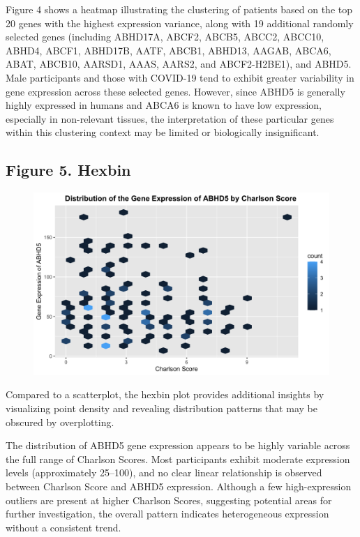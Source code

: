 \documentclass{article}
\begin{document}
Figure 4 shows a heatmap illustrating the clustering of patients based on the top 20 genes with the highest expression variance, along with 19 additional randomly selected genes (including ABHD17A, ABCF2, ABCB5, ABCC2, ABCC10, ABHD4, ABCF1, ABHD17B, AATF, ABCB1, ABHD13, AAGAB, ABCA6, ABAT, ABCB10, AARSD1, AAAS, AARS2, and ABCF2-H2BE1), and ABHD5. Male participants and those with COVID-19 tend to exhibit greater variability in gene expression across these selected genes. However, since ABHD5 is generally highly expressed in humans and ABCA6 is known to have low expression, especially in non-relevant tissues, the interpretation of these particular genes within this clustering context may be limited or biologically insignificant.

\subsection{Figure 5. Hexbin}
\begin{figure}[H]
    \centering
    \includegraphics[width=1\linewidth]{Hexbin.png}
    \label{fig:placeholder}
\end{figure}

Compared to a scatterplot, the hexbin plot provides additional insights by visualizing point density and revealing distribution patterns that may be obscured by overplotting.

The distribution of ABHD5 gene expression appears to be highly variable across the full range of Charlson Scores. Most participants exhibit moderate expression levels (approximately 25–100), and no clear linear relationship is observed between Charlson Score and ABHD5 expression. Although a few high-expression outliers are present at higher Charlson Scores, suggesting potential areas for further investigation, the overall pattern indicates heterogeneous expression without a consistent trend.
\end{document}
